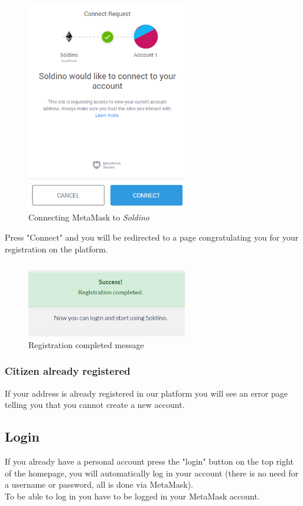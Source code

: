 	\begin{figure}[H]
		\includegraphics[width=7cm]{res/images/metamask_connect.png}
		\centering
		\caption{Connecting MetaMask to \textit{Soldino}}
	\end{figure}
	\noindent Press "Connect" and you will be redirected to a page 
	congratulating you for your registration on the platform.
	\begin{figure}[H]
		\includegraphics[width=7cm]{res/images/registration_complete.png}
		\centering
		\caption{Registration completed message}
	\end{figure}
	\subsubsection{Citizen already registered}
	If your address is already registered in our platform you will see an
	error page telling you that you cannot create a new account.
	
	\subsection{Login}
	If you already have a personal account press the "login" button on the 
	top right of the homepage, you will automatically log in your account 
	(there is no need for a username or password, all is done via MetaMask). 
	\\To be able to log in you have to be logged in your MetaMask account.

